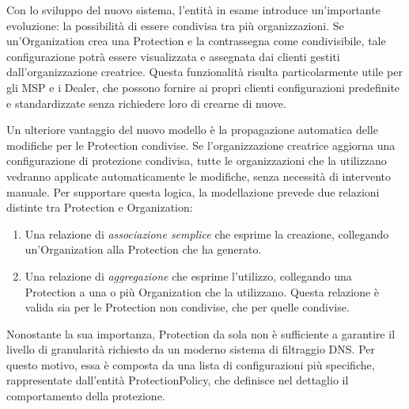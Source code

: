 Con lo sviluppo del nuovo sistema, l’entità in esame introduce un'importante evoluzione: la possibilità di essere condivisa tra più organizzazioni. Se un’Organization crea una Protection e la contrassegna come condivisibile, tale configurazione potrà essere visualizzata e assegnata dai clienti gestiti dall'organizzazione creatrice. Questa funzionalità risulta particolarmente utile per gli MSP e i Dealer, che possono fornire ai propri clienti configurazioni predefinite e standardizzate senza richiedere loro di crearne di nuove.

Un ulteriore vantaggio del nuovo modello è la propagazione automatica delle modifiche per le Protection condivise. Se l’organizzazione creatrice aggiorna una configurazione di protezione condivisa, tutte le organizzazioni che la utilizzano vedranno applicate automaticamente le modifiche, senza necessità di intervento manuale. Per supportare questa logica, la modellazione prevede due relazioni distinte tra Protection e Organization:
\begin{enumerate}
  \item Una relazione di \textit{associazione semplice} che esprime la creazione, collegando un’Organization alla Protection che ha generato.
  \item Una relazione di \textit{aggregazione} che esprime l’utilizzo, collegando una Protection a una o più Organization che la utilizzano. Questa relazione è valida sia per le Protection non condivise, che per quelle condivise.
\end{enumerate}

Nonostante la sua importanza, Protection da sola non è sufficiente a garantire il livello di granularità richiesto da un moderno sistema di filtraggio DNS. Per questo motivo, essa è composta da una lista di configurazioni più specifiche, rappresentate dall'entità ProtectionPolicy, che definisce nel dettaglio il comportamento della protezione.

